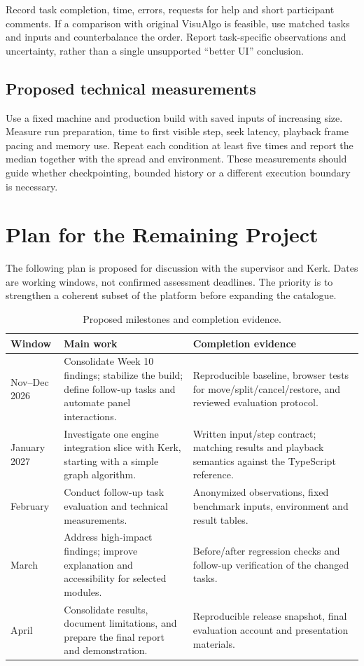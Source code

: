 \documentclass[11pt,a4paper]{article}
\newcommand{\page}{\par\vspace{8pt}}
\begin{document}
Record task completion, time, errors, requests for help and short participant comments. If a comparison with original VisuAlgo is feasible, use matched tasks and inputs and counterbalance the order. Report task-specific observations and uncertainty, rather than a single unsupported ``better UI'' conclusion.

\subsection{Proposed technical measurements}
Use a fixed machine and production build with saved inputs of increasing size. Measure run preparation, time to first visible step, seek latency, playback frame pacing and memory use. Repeat each condition at least five times and report the median together with the spread and environment. These measurements should guide whether checkpointing, bounded history or a different execution boundary is necessary.

\page
\section{Plan for the Remaining Project}
The following plan is proposed for discussion with the supervisor and Kerk. Dates are working windows, not confirmed assessment deadlines. The priority is to strengthen a coherent subset of the platform before expanding the catalogue.

\begin{table}[tbp]\small\centering
\caption{Proposed milestones and completion evidence.}\label{tab:plan}
\begin{tabularx}{\linewidth}{@{}p{20mm}p{48mm}X@{}}\toprule
Window & Main work & Completion evidence\\\midrule
Nov--Dec 2026 & Consolidate Week 10 findings; stabilize the build; define follow-up tasks and automate panel interactions. & Reproducible baseline, browser tests for move/split/cancel/restore, and reviewed evaluation protocol.\\
January 2027 & Investigate one engine integration slice with Kerk, starting with a simple graph algorithm. & Written input/step contract; matching results and playback semantics against the TypeScript reference.\\
February & Conduct follow-up task evaluation and technical measurements. & Anonymized observations, fixed benchmark inputs, environment and result tables.\\
March & Address high-impact findings; improve explanation and accessibility for selected modules. & Before/after regression checks and follow-up verification of the changed tasks.\\
April & Consolidate results, document limitations, and prepare the final report and demonstration. & Reproducible release snapshot, final evaluation account and presentation materials.\\\bottomrule
\end{tabularx}
\end{table}
\end{document}
